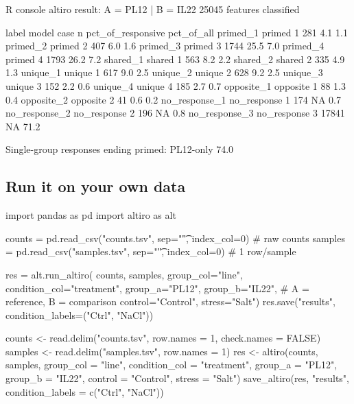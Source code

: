 \documentclass[11pt,a4paper]{article}
\begin{document}
\begin{terminal}{R console}
altiro result: A = PL12 | B = IL22
25045 features classified

         label       model case     n pct_of_responsive pct_of_all
      primed_1      primed    1   281               4.1        1.1
      primed_2      primed    2   407               6.0        1.6
      primed_3      primed    3  1744              25.5        7.0
      primed_4      primed    4  1793              26.2        7.2
      shared_1      shared    1   563               8.2        2.2
      shared_2      shared    2   335               4.9        1.3
      unique_1      unique    1   617               9.0        2.5
      unique_2      unique    2   628               9.2        2.5
      unique_3      unique    3   152               2.2        0.6
      unique_4      unique    4   185               2.7        0.7
    opposite_1    opposite    1    88               1.3        0.4
    opposite_2    opposite    2    41               0.6        0.2
 no_response_1 no_response    1   174                NA        0.7
 no_response_2 no_response    2   196                NA        0.8
 no_response_3 no_response    3 17841                NA       71.2

Single-group responses ending primed: PL12-only 74.0%
\end{terminal}

\subsection{Run it on your own data}

\begin{pycode}
import pandas as pd
import altiro as alt

counts  = pd.read_csv("counts.tsv",  sep="\t", index_col=0)  # raw counts
samples = pd.read_csv("samples.tsv", sep="\t", index_col=0)  # 1 row/sample

res = alt.run_altiro(
    counts, samples,
    group_col="line", condition_col="treatment",
    group_a="PL12", group_b="IL22",        # A = reference, B = comparison
    control="Control", stress="Salt")
res.save("results", condition_labels=("Ctrl", "NaCl"))
\end{pycode}

\begin{rcode}
counts  <- read.delim("counts.tsv",  row.names = 1, check.names = FALSE)
samples <- read.delim("samples.tsv", row.names = 1)
res <- altiro(counts, samples,
              group_col = "line", condition_col = "treatment",
              group_a = "PL12", group_b = "IL22",
              control = "Control", stress = "Salt")
save_altiro(res, "results", condition_labels = c("Ctrl", "NaCl"))
\end{rcode}
\end{document}
